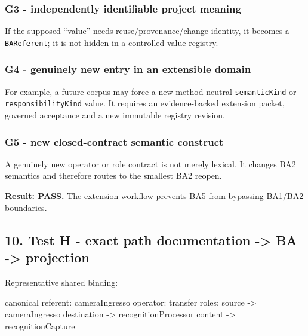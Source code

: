 \documentclass[
  10pt,
  a4paper,
]{article}
\newenvironment{Shaded}{}{}
\newcommand{\NormalTok}[1]{#1}
\begin{document}
\subsubsection{G3 - independently identifiable project
meaning}\label{g3---independently-identifiable-project-meaning}

If the supposed ``value'' needs reuse/provenance/change identity, it
becomes a \texttt{BAReferent}; it is not hidden in a controlled-value
registry.

\subsubsection{G4 - genuinely new entry in an extensible
domain}\label{g4---genuinely-new-entry-in-an-extensible-domain}

For example, a future corpus may force a new method-neutral
\texttt{semanticKind} or \texttt{responsibilityKind} value. It requires
an evidence-backed extension packet, governed acceptance and a new
immutable registry revision.

\subsubsection{G5 - new closed-contract semantic
construct}\label{g5---new-closed-contract-semantic-construct}

A genuinely new operator or role contract is not merely lexical. It
changes BA2 semantics and therefore routes to the smallest BA2 reopen.

\textbf{Result: PASS.} The extension workflow prevents BA5 from
bypassing BA1/BA2 boundaries.

\subsection{10. Test H - exact path documentation -\textgreater{} BA
-\textgreater{}
projection}\label{test-h---exact-path-documentation---ba---projection}

Representative shared binding:

\begin{Shaded}
\begin{Highlighting}[]
\NormalTok{canonical referent: cameraIngresso}
\NormalTok{operator: transfer}
\NormalTok{roles:}
\NormalTok{  source      {-}\textgreater{} cameraIngresso}
\NormalTok{  destination {-}\textgreater{} recognitionProcessor}
\NormalTok{  content     {-}\textgreater{} recognitionCapture}
\end{Highlighting}
\end{Shaded}
\end{document}
